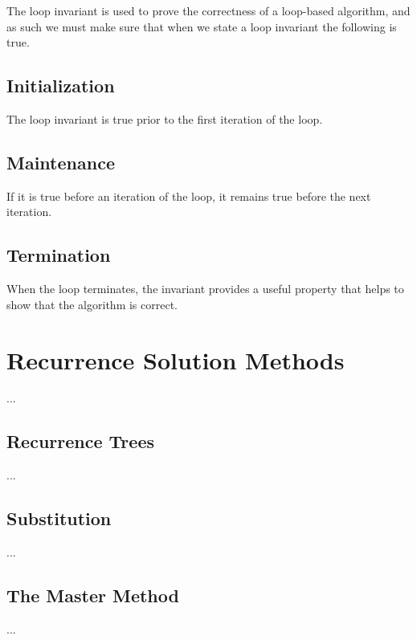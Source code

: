 The loop invariant is used to prove the correctness of a loop-based algorithm,
and as such we must make sure that when we state a loop invariant the
following is true.

\subsection{Initialization}
The loop invariant is true prior to the first iteration of the loop.

\subsection{Maintenance}
If it is true before an iteration of the loop, it remains true before the next
iteration.

\subsection{Termination}
When the loop terminates, the invariant provides a useful property that helps
to show that the algorithm is correct.

\newpage
\section{Recurrence Solution Methods}
...

\subsection{Recurrence Trees}
...

\subsection{Substitution}
...

\subsection{The Master Method}
...


